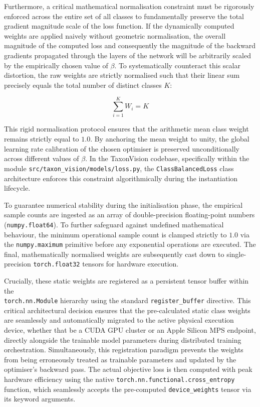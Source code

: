 Furthermore, a critical mathematical normalisation constraint must be rigorously enforced across the entire set of all classes to fundamentally preserve the total gradient magnitude scale of the loss function. If the dynamically computed weights are applied naively without geometric normalisation, the overall magnitude of the computed loss and consequently the magnitude of the backward gradients propagated through the layers of the network will be arbitrarily scaled by the empirically chosen value of $\beta$. To systematically counteract this scalar distortion, the raw weights are strictly normalised such that their linear sum precisely equals the total number of distinct classes $K$:

\[
  \sum_{i=1}^K W_i = K
\]

This rigid normalisation protocol ensures that the arithmetic mean class weight remains strictly equal to $1.0$. By anchoring the mean weight to unity, the global learning rate calibration of the chosen optimiser is preserved unconditionally across different values of $\beta$. In the TaxonVision codebase, specifically within the module \texttt{src/taxon\_vision/models/loss.py}, the \texttt{ClassBalancedLoss} class architecture enforces this constraint algorithmically during the instantiation lifecycle.

To guarantee numerical stability during the initialisation phase, the empirical sample counts are ingested as an array of double-precision floating-point numbers (\texttt{numpy.float64}). To further safeguard against undefined mathematical behaviour, the minimum operational sample count is clamped strictly to $1.0$ via the \texttt{numpy.maximum} primitive before any exponential operations are executed. The final, mathematically normalised weights are subsequently cast down to single-precision \texttt{torch.float32} tensors for hardware execution.

Crucially, these static weights are registered as a persistent tensor buffer within the\\\texttt{torch.nn.Module} hierarchy using the standard \texttt{register\_buffer} directive. This critical architectural decision ensures that the pre-calculated static class weights are seamlessly and automatically migrated to the active physical execution device, whether that be a CUDA GPU cluster or an Apple Silicon MPS endpoint, directly alongside the trainable model parameters during distributed training orchestration. Simultaneously, this registration paradigm prevents the weights from being erroneously treated as trainable parameters and updated by the optimiser's backward pass. The actual objective loss is then computed with peak hardware efficiency using the native \texttt{torch.nn.functional.cross\_entropy} function, which seamlessly accepts the pre-computed \texttt{device\_weights} tensor via its keyword arguments.

